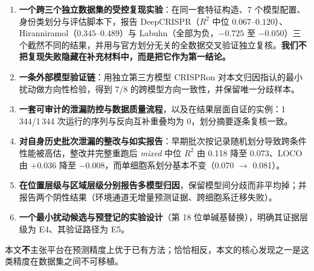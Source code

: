 \begin{enumerate}
\item \textbf{一个跨三个独立数据集的受控复现实验}：在同一套特征构造、7 个模型配置、身份类划分与评估脚本下，报告 DeepCRISPR（$R^{2}$ 中位 $0.067$--$0.120$）、Hiranniramol（$0.345$--$0.489$）与 Labuhn（全部为负，$-0.725$ 至 $-0.050$）三个截然不同的结果，并用与官方划分无关的全数据交叉验证独立复核。\textbf{我们不把复现失败隐藏在补充材料中，而是把它作为第一结论。}
\item \textbf{一条外部模型验证链}：用独立第三方模型 CRISPRon 对本文归因指认的最小扰动做方向性检验，得到 7/8 的跨模型方向一致性，并保留唯一分歧样本。
\item \textbf{一套可审计的泄漏防控与数据质量流程}，以及在结果层面自证的实例：1\,344/1\,344 次运行的序列与反向互补重叠均为 0，划分摘要逐条复核一致。
\item \textbf{对自身历史批次泄漏的整改与如实报告}：早期批次按记录随机划分导致跨条件性能被高估，整改并完整重跑后 \emph{mixed} 中位 $R^{2}$ 由 0.118 降至 0.073、LOCO 由 $+0.036$ 降至 $-0.008$，而单细胞系划分基本不变（0.070 $\rightarrow$ 0.081）。
\item \textbf{在位置层级与区域层级分别报告多模型归因}，保留模型间分歧而非平均掉；并报告两个阴性结果（环境通道无增量预测证据、跨细胞系迁移失败）。
\item \textbf{一个最小扰动候选与预登记的实验设计}（第 18 位单碱基替换），明确其证据层级为 E4、其验证路径为 E5。
\end{enumerate}

本文\textbf{不}主张平台在预测精度上优于已有方法；恰恰相反，本文的核心发现之一是这类精度在数据集之间不可移植。
